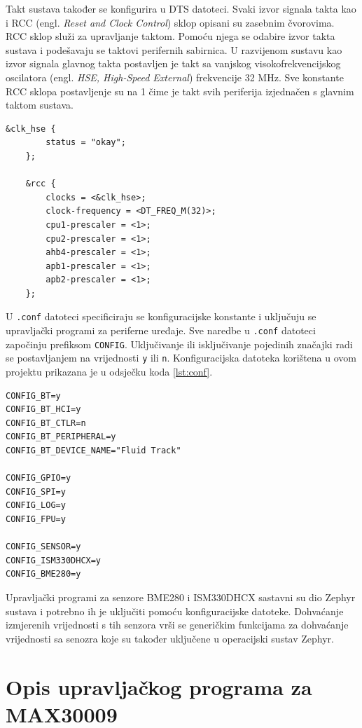 \documentclass[../diplomski_rad.tex]{subfiles}
\begin{document}
Takt sustava također se konfigurira u DTS datoteci. Svaki izvor signala takta kao i 
RCC (engl. \textit{Reset and Clock Control}) sklop opisani su zasebnim čvorovima. 
RCC sklop služi za upravljanje taktom. Pomoću njega se odabire izvor takta sustava i podešavaju se 
taktovi perifernih sabirnica. 
U razvijenom sustavu kao izvor signala glavnog takta postavljen je takt sa vanjskog visokofrekvencijskog 
oscilatora (engl. \textit{HSE, High-Speed External}) frekvencije 32 MHz. Sve konstante RCC sklopa postavljenje su na 1 
čime je takt svih periferija izjednačen s glavnim taktom sustava.   
\begin{lstlisting}[label={lst:takt},style=CStyle,caption={Konfiguracijska takta sustava},captionpos=b]
    &clk_hse {
        status = "okay";
    };

    &rcc {
        clocks = <&clk_hse>;
        clock-frequency = <DT_FREQ_M(32)>;
        cpu1-prescaler = <1>;
        cpu2-prescaler = <1>;
        ahb4-prescaler = <1>;
        apb1-prescaler = <1>;
        apb2-prescaler = <1>;
    };
\end{lstlisting} 

U \texttt{.conf} datoteci specificiraju se 
konfiguracijske konstante i uključuju se upravljački programi za periferne uređaje. 
Sve naredbe u \texttt{.conf} datoteci započinju prefiksom \texttt{CONFIG}. 
Uključivanje ili isključivanje pojedinih značajki radi se postavljanjem na vrijednosti \texttt{y} ili \texttt{n}.
Konfiguracijska datoteka korištena u ovom projektu prikazana je u odsječku koda \ref{lst:conf}.
\begin{lstlisting}[label={lst:conf},style=CStyle,caption={Konfiguracijska datoteka razvijenog sustava},captionpos=b]
CONFIG_BT=y
CONFIG_BT_HCI=y
CONFIG_BT_CTLR=n
CONFIG_BT_PERIPHERAL=y
CONFIG_BT_DEVICE_NAME="Fluid Track"

CONFIG_GPIO=y
CONFIG_SPI=y
CONFIG_LOG=y
CONFIG_FPU=y

CONFIG_SENSOR=y
CONFIG_ISM330DHCX=y
CONFIG_BME280=y
\end{lstlisting} 

Upravljački programi za senzore BME280 i ISM330DHCX sastavni su dio Zephyr sustava i potrebno ih je uključiti 
pomoću konfiguracijske datoteke. 
Dohvaćanje izmjerenih vrijednosti s tih senzora vrši se generičkim funkcijama za dohvaćanje vrijednosti sa senozra koje 
su također uključene u operacijski sustav Zephyr. 

\section{Opis upravljačkog programa za MAX30009}
\end{document}
